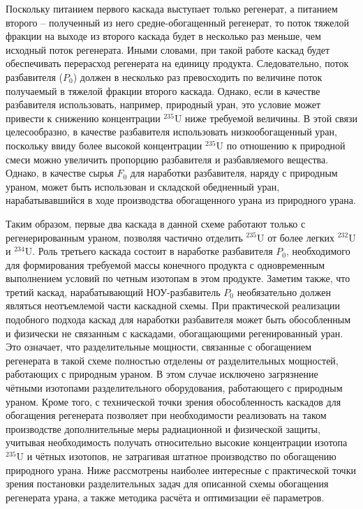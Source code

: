 Поскольку питанием первого каскада выступает только регенерат, а питанием второго -- полученный из него средне-обогащенный регенерат, то поток тяжелой фракции на выходе из второго каскада будет в несколько раз меньше, чем исходный поток регенерата. Иными словами, при такой работе каскад будет обеспечивать перерасход регенерата на единицу продукта. Следовательно, поток разбавителя ($P_{0}$) должен в несколько раз превосходить по величине поток получаемый в тяжелой фракции второго каскада. Однако, если в качестве разбавителя использовать, например, природный уран, это условие может привести к снижению концентрации $^{235}$U ниже требуемой величины. В этой связи целесообразно, в качестве разбавителя использовать низкообогащенный уран, поскольку ввиду более высокой концентрации $^{235}$U по отношению к природной смеси можно увеличить пропорцию разбавителя и разбавляемого вещества. Однако, в качестве сырья $F_0$ для наработки разбавителя, наряду с природным ураном, может быть использован и складской обедненный уран, нарабатывавшийся в ходе производства обогащенного урана из природного урана. 

Таким образом, первые два каскада в данной схеме работают только с регенерированным ураном, позволяя частично отделить $^{235}$U от более легких $^{232}$U и $^{234}$U. Роль третьего каскада состоит в наработке разбавителя $P_{0}$, необходимого для формирования требуемой массы конечного продукта с одновременным выполнением условий по четным изотопам в этом продукте. Заметим также, что третий каскад, нарабатывающий НОУ-разбавитель $P_{0}$ необязательно должен являться неотъемлемой части каскадной схемы. При практической реализации подобного подхода каскад для наработки разбавителя может быть обособленным и физически не связанным с каскадами, обогащающими регенированный уран. Это означает, что разделительные мощности, связанные с обогащением регенерата в такой схеме полностью отделены от разделительных мощностей, работающих с природным ураном. В этом случае исключено загрязнение чётными изотопами разделительного оборудования, работающего с природным ураном. Кроме того, с технической точки зрения обособленность каскадов для обогащения регенерата позволяет при необходимости реализовать на таком производстве дополнительные меры радиационной и физической защиты, учитывая необходимость получать относительно высокие концентрации изотопа $^{235}$U и чётных изотопов, не затрагивая штатное производство по обогащению природного урана.
Ниже рассмотрены наиболее интересные с практической точки зрения постановки разделительных задач для описанной схемы обогащения регенерата урана, а также методика расчёта и оптимизации её параметров.

